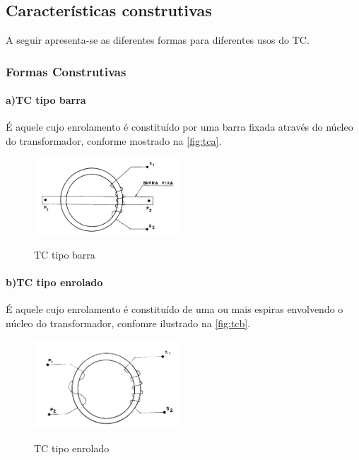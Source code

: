 \documentclass[a5paper,english,spanish,brazil]{ufsc-thesis}
\begin{document}
		\subsection{Características construtivas}
			A seguir apresenta-se as diferentes formas para diferentes usos do TC.

			\subsubsection{Formas Construtivas}
				\paragraph*{a)\indent TC tipo barra}
					É aquele cujo enrolamento é constituído por uma barra fixada através do núcleo do transformador, conforme mostrado na \autoref{fig:tca}.
					\begin{figure}[htb]
						\caption{TC tipo barra}
						\centering
						\includegraphics[width=5.4cm]{TC(1).png}
						\label{fig:tca}
					\end{figure}
				\paragraph*{b)\indent TC tipo enrolado}
					É aquele cujo enrolamento é constituído de uma ou mais espiras envolvendo o núcleo do transformador, confomre ilustrado na \autoref{fig:tcb}.
					\begin{figure}[htb]
						\caption{TC tipo enrolado}
						\centering
						\includegraphics[width=5.4cm]{TC(2).png}
						\label{fig:tcb}
					\end{figure}
\end{document}
